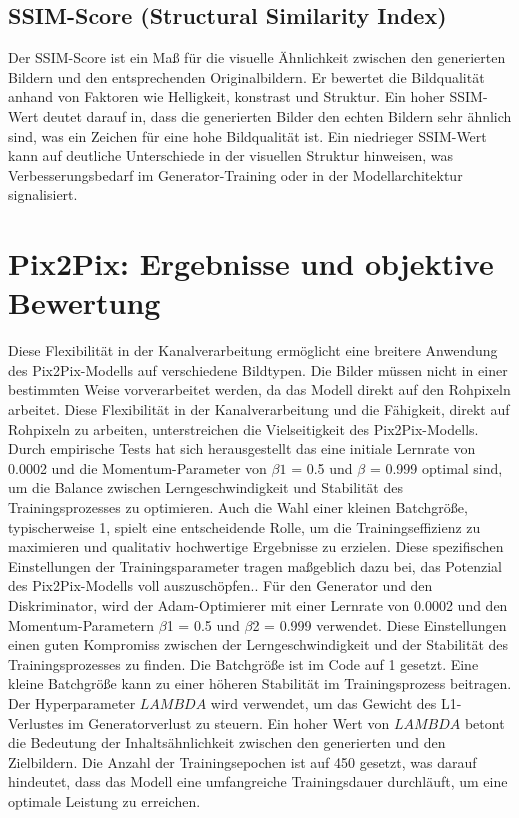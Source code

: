 \subsection{SSIM-Score (Structural Similarity Index)}
Der SSIM-Score ist ein Maß für die visuelle Ähnlichkeit zwischen den generierten Bildern und den entsprechenden Originalbildern. Er bewertet die Bildqualität anhand von Faktoren wie Helligkeit, konstrast und Struktur. Ein hoher SSIM-Wert deutet darauf in, dass die generierten Bilder den echten Bildern sehr ähnlich sind, was ein Zeichen für eine hohe Bildqualität ist. Ein niedrieger SSIM-Wert kann auf deutliche Unterschiede in der visuellen Struktur hinweisen, was Verbesserungsbedarf im Generator-Training oder in der Modellarchitektur signalisiert.

\section{Pix2Pix: Ergebnisse und objektive Bewertung}
 Diese Flexibilität in der Kanalverarbeitung ermöglicht eine breitere Anwendung des Pix2Pix-Modells auf verschiedene Bildtypen. Die Bilder müssen nicht in einer bestimmten Weise vorverarbeitet werden, da das Modell direkt auf den Rohpixeln arbeitet. Diese Flexibilität in der Kanalverarbeitung und die Fähigkeit, direkt auf Rohpixeln zu arbeiten, unterstreichen die Vielseitigkeit des Pix2Pix-Modells.
  Durch empirische Tests hat sich herausgestellt das eine initiale Lernrate von 0.0002 und die Momentum-Parameter von $\beta1$ = 0.5 und $\beta$ = 0.999 optimal sind, um die Balance zwischen Lerngeschwindigkeit und Stabilität des Trainingsprozesses zu optimieren. Auch die Wahl einer kleinen Batchgröße, typischerweise 1, spielt eine entscheidende Rolle, um die Trainingseffizienz zu maximieren und qualitativ hochwertige Ergebnisse zu erzielen. Diese spezifischen Einstellungen der Trainingsparameter tragen maßgeblich dazu bei, das Potenzial des Pix2Pix-Modells voll auszuschöpfen.\cite{PhillipIsola.}.\newline
  Für den Generator und den Diskriminator, wird der Adam-Optimierer mit einer Lernrate von 0.0002 und den Momentum-Parametern $\beta$1 = 0.5 und $\beta$2 = 0.999 verwendet. Diese Einstellungen einen guten Kompromiss zwischen der Lerngeschwindigkeit und der Stabilität des Trainingsprozesses zu finden. Die Batchgröße ist im Code auf 1 gesetzt. Eine kleine Batchgröße kann zu einer höheren Stabilität im Trainingsprozess beitragen. Der Hyperparameter $LAMBDA$ wird verwendet, um das Gewicht des L1-Verlustes im Generatorverlust zu steuern. Ein hoher Wert von $LAMBDA$ betont die Bedeutung der Inhaltsähnlichkeit zwischen den generierten und den Zielbildern. Die Anzahl der Trainingsepochen ist auf 450 gesetzt, was darauf hindeutet, dass das Modell eine umfangreiche Trainingsdauer durchläuft, um eine optimale Leistung zu erreichen.

